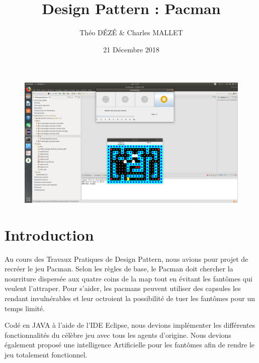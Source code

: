 \documentclass[a4paper, 11pt]{article}
\begin{document}
\title{Design Pattern : Pacman}
\author{Théo \textsc{DÉZÉ}  \& Charles \textsc {MALLET}}
\date{21 Décembre 2018} 


\maketitle

\vspace{2cm}
\begin{figure}[ht]

\includegraphics[scale=0.7,trim=26.2cm 5cm 23.9cm 17.7cm, clip=true]{img/Pacman.png}

\end{figure}


\newpage

\tableofcontents

\pagebreak

\part*{Introduction}

Au cours des Travaux Pratiques de Design Pattern, nous avions pour projet de recréer le jeu Pacman. Selon les règles de base, le Pacman doit chercher la nourriture dispersée aux quatre 
coins de la map tout en évitant les fantômes qui veulent l'attraper. Pour s'aider, les pacmans peuvent utiliser des capsules les rendant invulnérables et leur octroient 
la possibilité de tuer les fantômes pour un temps limité.

Codé en JAVA à l'aide de l'IDE Eclipse, nous devions implémenter les différentes fonctionnalités du célèbre jeu avec tous les agents d'origine. Nous devions également
proposé une intelligence Artificielle pour les fantômes afin de rendre le jeu totalement fonctionnel. 
\end{document}
